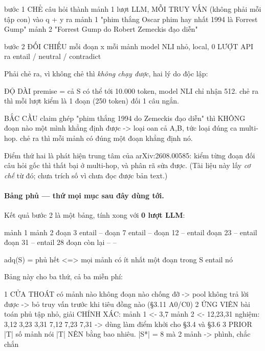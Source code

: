 \documentclass[11pt,a4paper]{article}
\begin{document}
\begin{dia}
bước 1   CHẺ câu hỏi thành mảnh    1 lượt LLM, MỖI TRUY VẤN (không phải mỗi tập con)
         vào  q + y
         ra   mảnh 1  "phim thắng Oscar phim hay nhất 1994 là Forrest Gump"
              mảnh 2  "Forrest Gump do Robert Zemeckis đạo diễn"

bước 2   ĐỐI CHIẾU mỗi đoạn x mỗi mảnh    model NLI nhỏ, local, 0 LƯỢT API
         ra   entail / neutral / contradict
\end{dia}

Phải chẻ ra, vì không chẻ thì \emph{không chạy được}, hai lý do độc lập:

\begin{dia}
ĐỘ DÀI    premise = cả S có thể tới 10.000 token, model NLI chỉ nhận 512.
          chẻ ra thì mỗi lượt kiểm là 1 đoạn (250 token) đối 1 câu ngắn.

BẮC CẦU   claim ghép "phim thắng 1994 do Zemeckis đạo diễn" thì KHÔNG đoạn nào
          một mình khẳng định được -> loại oan cả {A,B}, tức loại đúng ca multi-hop.
          chẻ ra thì mỗi mảnh có đúng một đoạn khẳng định nó.
\end{dia}

Điểm thứ hai là phát hiện trung tâm của arXiv:2608.00585: kiểm từng đoạn đối câu hỏi gốc thì
thất bại ở multi-hop, và phân rã sửa được. (Tài liệu này lấy \emph{cơ chế} từ đó; chưa trích
số vì chưa đọc được bản text.)

\paragraph{Bảng phủ --- thứ mọi mục sau đây dùng tới.} Kết quả bước 2 là một bảng, tính xong
với \textbf{0 lượt LLM}:

\begin{dia}
                              mảnh 1              mảnh 2
đoạn  3                       entail                 --
đoạn  7                       entail                 --
đoạn 12                         --                entail
đoạn 23                         --                entail
đoạn 31                         --                entail
28 đoạn còn lại                 --                   --

adq(S) = phủ hết  <=>  mọi mảnh có ít nhất một đoạn trong S entail nó
\end{dia}

Bảng này cho ba thứ, cả ba miễn phí:

\begin{dia}
1  CỬA THOÁT    có mảnh nào không đoạn nào chống đỡ -> pool không trả lời được
                -> bỏ truy vấn trước khi tiêu đồng nào   (§3.11 A0/C0)
2  ỨNG VIÊN     bài toán phủ tập nhỏ, giải CHÍNH XÁC:
                   mảnh 1 <- {3,7}   mảnh 2 <- {12,23,31}
                   nghiệm:  {3,12} {3,23} {3,31} {7,12} {7,23} {7,31}
                -> dùng làm điểm khởi cho §3.4 và §3.6
3  PRIOR |T|    số mảnh nói |T| NÊN bằng bao nhiêu.
                |S*| = 8 mà 2 mảnh -> phình, chắc chắn
\end{dia}
\end{document}
